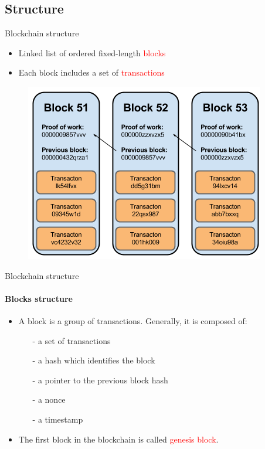 \documentclass{beamer}
\newcommand\red[1]{\textcolor{red}{#1}}
\begin{document}
  \subsection{Structure}
  \begin{frame}{Blockchain structure}
    \begin{itemize}
      \item Linked list of ordered fixed-length \red{blocks}
      \item Each block includes a set of \red{transactions}
    \end{itemize}

    \begin{figure}[!htb]
      \centering
      \includegraphics[width=0.45\linewidth]{../img/blockchain-basic-schema.png}
    \end{figure}
  \end{frame}




  \begin{frame}{Blockchain structure}
    \framesubtitle{Blocks structure}
      \begin{itemize}
        \item  A block is a group of transactions. Generally, it is composed of:
        \begin{itemize}
          \item[-] a set of transactions
          \item[-] a hash which identifies the block
          \item[-] a pointer to the previous block hash
          \item[-] a nonce
          \item[-] a timestamp
        \end{itemize}
        \item The first block in the blockchain is called \red{genesis block}.
      \end{itemize}
  \end{frame}
\end{document}

